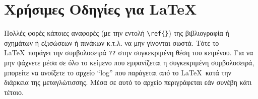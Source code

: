 \section{Χρήσιμες Οδηγίες για \LaTeX}
\label{sec:LaTeX}

{\color{red}
Πολλές φορές κάποιες αναφορές (με την εντολή \verb|\ref{}|) της
βιβλιογραφία ή σχημάτων ή εξισώσεων ή πινάκων κ.τ.λ. να μην
γίνονται σωστά. Τότε το \LaTeX\ παράγει την συμβολοσειρά \verb|??|
στην συγκεκριμένη θέση του κειμένου. Για να μην ψάχνετε μέσα σε
όλο το κείμενο που εμφανίζεται η συγκεκριμένη συμβολοσειρά,
μπορείτε να ανοίξετε το αρχείο ``log'' που παράγεται από το \LaTeX\
κατά την διάρκεια της μεταγλώτισσης. Μέσα σε αυτό το αρχείο
περιγράφεται εάν συνέβη κάτι τέτοιο.}